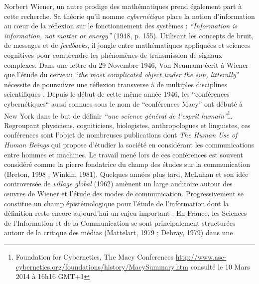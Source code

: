 Norbert Wiener, un autre prodige des math\'ematiques prend \'egalement
part \`a cette recherche. Sa th\'eorie qu{\textquoteright}il nomme
\textit{cybern\'etique }place la notion d{\textquoteright}information
au c{\oe}ur de la r\'eflexion sur le fonctionnement des syst\`emes :
\textit{{\textquotedblleft}Information is information, not matter or
energy{\textquotedblright}} (1948, p. 155). Utilisant les concepts de
bruit, de messages et de \textit{feedbacks}, il jongle entre
math\'ematiques appliqu\'ees et sciences cognitives pour comprendre les
ph\'enom\`enes de transmission de signaux complexes. Dans une lettre du
29 Novembre 1946, Von Neumann \'ecrit \`a Wiener que
l{\textquoteright}\'etude du cerveau {\textquotedblleft}\textit{the
most complicated object under the sun, litterally}{\textquotedblright}
n\'ecessite de poursuivre une r\'eflexion transverse \`a de multiples
disciplines scientifiques \cite{Masani1990}. Depuis le d\'ebut de cette
m\^eme ann\'ee 1946, les {\textquotedblleft}conf\'erences
cybern\'etiques{\textquotedblleft} aussi connues sous le nom de
{\textquotedblleft}conf\'erences Macy{\textquotedblright} ont
d\'ebut\'e \`a New York dans le but de d\'efinir
\textit{{\textquotedblleft}une science g\'en\'eral de
l{\textquoteright}esprit humain{\textquotedblright}}\footnote{
Foundation for Cybernetics, The Macy Conferences
\url{http://www.asc-cybernetics.org/foundations/history/MacySummary.htm}
consult\'e le 10 Mars 2014 \`a 16h16 GMT+1}. Regroupant physiciens,
cogniticiens, biologistes, anthropologues et linguistes, ces
conf\'erences sont l{\textquoteright}objet de nombreuses publications
dont \textit{The Human Use of Human Beings} \cite{Wiener1954} qui propose
d{\textquoteright}\'etudier la soci\'et\'e en consid\'erant les
communications entre hommes et machines. Le travail men\'e lors de ces
conf\'erences est souvent consid\'er\'e comme la pierre fondatrice du
champ des \'etudes sur la communication (Breton, 1998 ; Winkin, 1981).
Quelques ann\'ees plus tard, McLuhan et son id\'ee controvers\'ee de
\textit{village global }(1962) am\`enent un large auditoire autour des
{\oe}uvres de Wiener et l{\textquoteright}\'etude des modes de
communication. Progressivement se constitue un champ
\'epist\'emologique pour l{\textquoteright}\'etude de
l{\textquoteright}information dont la d\'efinition reste encore
aujourd{\textquoteright}hui un enjeu important \cite{Wolton1997}. En
France, les Sciences de l{\textquoteright}Information et de la
Communication se sont principalement structur\'ees autour de la
critique des m\'edias (Mattelart, 1979 ; Debray, 1979) dans une
